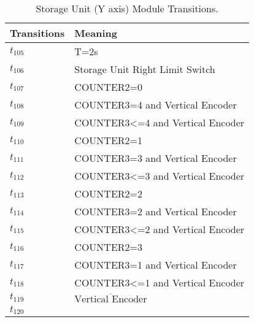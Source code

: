 \begin{table}[H]
\caption{Storage Unit (Y axis) Module Transitions.}
\centering
\begin{tabular}{M{5cm}M{10cm}}
Transitions & Meaning\\
\hline
\hyperlink{partialNet:tt1051}{\hypertarget{partialTable:tt105}{$t_{105}$}} & T=2s\\
\hyperlink{partialNet:t1061}{\hypertarget{partialTable:t106}{$t_{106}$}} & Storage Unit Right Limit Switch\\
\hyperlink{partialNet:t1071}{\hypertarget{partialTable:t107}{$t_{107}$}} & COUNTER2=0\\
\hyperlink{partialNet:t1081}{\hypertarget{partialTable:t108}{$t_{108}$}} & COUNTER3=4 and Vertical Encoder\\
\hyperlink{partialNet:t1091}{\hypertarget{partialTable:t109}{$t_{109}$}} & COUNTER3<=4 and Vertical Encoder\\
\hyperlink{partialNet:t1101}{\hypertarget{partialTable:t110}{$t_{110}$}} & COUNTER2=1\\
\hyperlink{partialNet:t1111}{\hypertarget{partialTable:t111}{$t_{111}$}} & COUNTER3=3 and Vertical Encoder\\
\hyperlink{partialNet:t1121}{\hypertarget{partialTable:t112}{$t_{112}$}} & COUNTER3<=3 and Vertical Encoder\\
\hyperlink{partialNet:t1131}{\hypertarget{partialTable:t113}{$t_{113}$}} & COUNTER2=2\\
\hyperlink{partialNet:t1141}{\hypertarget{partialTable:t114}{$t_{114}$}} & COUNTER3=2 and Vertical Encoder\\
\hyperlink{partialNet:t1151}{\hypertarget{partialTable:t115}{$t_{115}$}} & COUNTER3<=2 and Vertical Encoder\\
\hyperlink{partialNet:t1161}{\hypertarget{partialTable:t116}{$t_{116}$}} & COUNTER2=3\\
\hyperlink{partialNet:t1171}{\hypertarget{partialTable:t117}{$t_{117}$}} & COUNTER3=1 and Vertical Encoder\\
\hyperlink{partialNet:t1181}{\hypertarget{partialTable:t118}{$t_{118}$}} & COUNTER3<=1 and Vertical Encoder\\
\hyperlink{partialNet:t1191}{\hypertarget{partialTable:t119}{$t_{119}$}} & \(\overline{\mbox{Vertical Encoder}}\)\\
\hyperlink{partialNet:t1201}{\hypertarget{partialTable:t120}{$t_{120}$}} & \\
\end{tabular}
\end{table}
